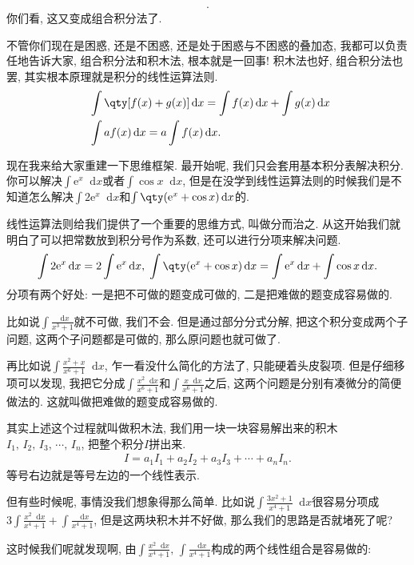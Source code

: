 \documentclass{ctexbook}
\newcommand{\e}{\mathrm{e}}
\newcommand*{\dif}{\mathop{}\!\mathrm{d}}
\begin{document}
{\begin{align*}
.\end{align*}
你们看, 这又变成组合积分法了. \par
不管你们现在是困惑, 还是不困惑, 还是处于困惑与不困惑的叠加态, 我都可以负责任地告诉大家, 组合积分法和积木法, 根本就是一回事! 积木法也好, 组合积分法也罢, 其实根本原理就是积分的线性运算法则. 
\begin{align*}
{}&\int\qty[f(x)+g(x)]\dif{x}=\int f(x)\dif{x}+\int g(x)\dif{x}\\\
{}&\int af(x)\dif{x}=a\int f(x)\dif{x}
.\end{align*}\par
现在我来给大家重建一下思维框架. 最开始呢, 我们只会套用基本积分表解决积分. 你可以解决$\int\e^{x}\dif{x}$或者$\int\cos{x}\dif{x}$, 但是在没学到线性运算法则的时候我们是不知道怎么解决$\int2\e^{x}\dif{x}$和$\int\qty(\e^{x}+\cos{x})\dif{x}$的. \par
线性运算法则给我们提供了一个重要的思维方式, 叫做分而治之. 从这开始我们就明白了可以把常数放到积分号作为系数, 还可以进行分项来解决问题. 
\begin{align*}
\int2\e^{x}\dif{x}=2\int\e^{x}\dif{x},\;\int\qty(\e^{x}+\cos{x})\dif{x}=\int\e^{x}\dif{x}+\int\cos{x}\dif{x}
.\end{align*}
分项有两个好处: 一是把不可做的题变成可做的, 二是把难做的题变成容易做的. \par
比如说$\int\frac{\dif{x}}{x^{3}+1}$就不可做, 我们不会. 但是通过部分分式分解, 把这个积分变成两个子问题, 这两个子问题都是可做的, 那么原问题也就可做了. \par
再比如说$\int\frac{x^{2}+x}{x^{6}+1}\dif{x}$, 乍一看没什么简化的方法了, 只能硬着头皮裂项. 但是仔细移项可以发现, 我把它分成$\int\frac{x^{2}\dif{x}}{x^{6}+1}$和$\int\frac{x\dif{x}}{x^{6}+1}$之后, 这两个问题是分别有凑微分的简便做法的. 这就叫做把难做的题变成容易做的. \par
其实上述这个过程就叫做积木法, 我们用一块一块容易解出来的积木$I_{1},\,I_{2},\,I_{3},\,\cdots,\,I_{n}$, 把整个积分$I$拼出来. 
\begin{align*}
I=a_{1}I_{1}+a_{2}I_{2}+a_{3}I_{3}+\cdots+a_{n}I_{n}
.\end{align*}
等号右边就是等号左边的一个线性表示. \par
但有些时候呢, 事情没我们想象得那么简单. 比如说$\int\frac{3x^{2}+1}{x^{4}+1}\dif{x}$很容易分项成$3\int\frac{x^{2}\dif{x}}{x^{4}+1}+\int\frac{\dif{x}}{x^{4}+1}$, 但是这两块积木并不好做, 那么我们的思路是否就堵死了呢? \par
这时候我们呢就发现啊, 由$\int\frac{x^{2}\dif{x}}{x^{4}+1},\,\int\frac{\dif{x}}{x^{4}+1}$构成的两个线性组合是容易做的: 
}
\end{document}
